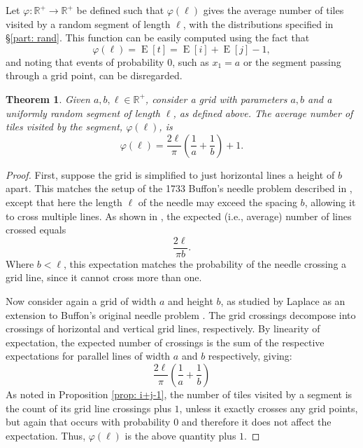 \documentclass[12pt, a4paper]{article}
\DeclareMathOperator{\E}{E}
\newcommand{\funta}{\varphi} %
\newcommand{\len}{\ell} %
\newcommand{\tiles}{t} %
\newtheorem{theorem}{Theorem}%
\begin{document}
Let $\funta: \mathbb R^+ \to \mathbb R^+$ be defined such that $\funta(\len)$ gives the average number of tiles visited by a random segment of length $\len$, with the distributions specified in \S\ref{part: rand}. This function can be easily computed using the fact that
\begin{equation}
\label{eq: funta E[i] E[j]}
\funta(\len) = \E[\tiles] = \E[i]+\E[j]-1,
\end{equation}
and noting that events of probability $0$, such as $x_1=a$ or the segment passing through a grid point, can be disregarded.

\begin{theorem}
\label{theo: funta, form}
Given $a, b, \len \in \mathbb R^+$, consider a grid with parameters $a, b$ and a uniformly random segment of length $\len$, as defined above. The average number of tiles visited by the segment, $\funta(\len)$, is 
\begin{equation}
\label{eq: funta, form}
\funta(\len) = \frac{2\len}{\pi}\left(\frac 1 a + \frac 1 b\right) + 1.
\end{equation}
\end{theorem}

\begin{proof}
First, suppose the grid is simplified to just horizontal lines a height of $b$ apart. This matches the setup of the 1733 Buffon's needle problem described in \cite{Mathai99}, except that here the length $\len$ of the needle may exceed the spacing $b$, allowing it to cross multiple lines. As shown in \cite{Ramaley69}, the expected (i.e., average) number of lines crossed equals
$$ \frac{2\len}{\pi b}.$$
Where $b<\len$, this expectation matches the probability of the needle crossing a grid line, since it cannot cross more than one.

Now consider again a grid of width $a$ and height $b$, as studied by Laplace as an extension to Buffon's original needle problem \cite{Arnow94}. The grid crossings decompose into crossings of horizontal and vertical grid lines, respectively. By linearity of expectation, the expected number of crossings is the sum of the respective expectations for parallel lines of width $a$ and $b$ respectively, giving:
\[
\frac{2\len}{\pi}\left(\frac 1 a + \frac 1 b\right)
\]
As noted in Proposition \ref{prop: i+j-1}, the number of tiles visited by a segment is the count of its grid line crossings plus $1$, unless it exactly crosses any grid points, but again that occurs with probability $0$ and therefore it does not affect the expectation. Thus, $\funta(\len)$ is the above quantity plus $1$.
\end{proof}
\end{document}
